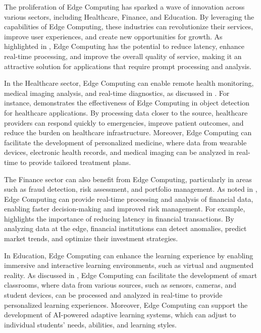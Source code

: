\documentclass[11pt,a4paper]{article}
\begin{document}
The proliferation of Edge Computing has sparked a wave of innovation across various sectors, including Healthcare, Finance, and Education. By leveraging the capabilities of Edge Computing, these industries can revolutionize their services, improve user experiences, and create new opportunities for growth. As highlighted in \cite{arxiv:1701.01090}, Edge Computing has the potential to reduce latency, enhance real-time processing, and improve the overall quality of service, making it an attractive solution for applications that require prompt processing and analysis.

In the Healthcare sector, Edge Computing can enable remote health monitoring, medical imaging analysis, and real-time diagnostics, as discussed in \cite{arxiv:2004.07311}. For instance, \cite{arxiv:1906.11056} demonstrates the effectiveness of Edge Computing in object detection for healthcare applications. By processing data closer to the source, healthcare providers can respond quickly to emergencies, improve patient outcomes, and reduce the burden on healthcare infrastructure. Moreover, Edge Computing can facilitate the development of personalized medicine, where data from wearable devices, electronic health records, and medical imaging can be analyzed in real-time to provide tailored treatment plans.

The Finance sector can also benefit from Edge Computing, particularly in areas such as fraud detection, risk assessment, and portfolio management. As noted in \cite{arxiv:2107.13374}, Edge Computing can provide real-time processing and analysis of financial data, enabling faster decision-making and improved risk management. For example, \cite{arxiv:2111.10076} highlights the importance of reducing latency in financial transactions. By analyzing data at the edge, financial institutions can detect anomalies, predict market trends, and optimize their investment strategies.

In Education, Edge Computing can enhance the learning experience by enabling immersive and interactive learning environments, such as virtual and augmented reality. As discussed in \cite{arxiv:2402.13056}, Edge Computing can facilitate the development of smart classrooms, where data from various sources, such as sensors, cameras, and student devices, can be processed and analyzed in real-time to provide personalized learning experiences. Moreover, Edge Computing can support the development of AI-powered adaptive learning systems, which can adjust to individual students' needs, abilities, and learning styles.
\end{document}

